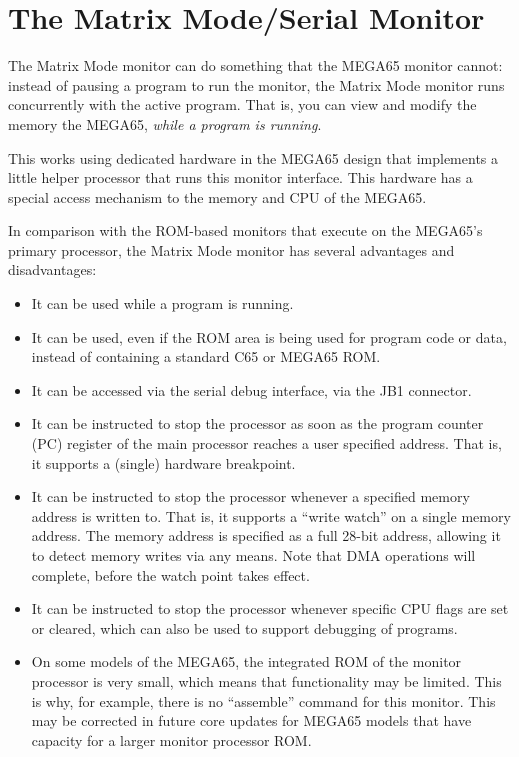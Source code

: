 \section{The Matrix Mode/Serial Monitor}
\label{sec:matrix-mode}

The Matrix Mode monitor can do something that the MEGA65 monitor cannot: instead of pausing a program to run the monitor, the Matrix Mode monitor runs concurrently with the active program. That is, you can view and modify the memory the MEGA65, {\em while a program is running}.

This works using dedicated hardware in the MEGA65 design that implements a little
helper processor that runs this monitor interface. This hardware has a special access mechanism
to the memory and CPU of the MEGA65.

In comparison with the ROM-based monitors that execute on the MEGA65's primary processor,
the Matrix Mode monitor has several advantages and disadvantages:
\begin{itemize}
\item It can be used while a program is running.
\item It can be used, even if the ROM area is being used for program code or data,
  instead of containing a standard C65 or MEGA65 ROM.
\item It can be accessed via the serial debug interface, via the JB1 connector.
\item It can be instructed to stop the processor as soon as the program counter (PC)
  register of the main processor reaches a user specified address. That is, it supports
  a (single) hardware breakpoint.
\item It can be instructed to stop the processor whenever a specified memory address
  is written to. That is, it supports a ``write watch'' on a single memory address.
  The memory address is specified as a full 28-bit address, allowing it to detect memory
  writes via any means. Note that DMA operations will complete, before the watch point
  takes effect.
\item It can be instructed to stop the processor whenever specific CPU flags are set
  or cleared, which can also be used to support debugging of programs.
\item On some models of the MEGA65, the integrated ROM of the monitor processor is
  very small, which means that functionality may be limited. This is why, for example,
  there is no ``assemble'' command for this monitor.  This may be corrected in future
  core updates for MEGA65 models that have capacity for a larger monitor processor ROM.
\end{itemize}


